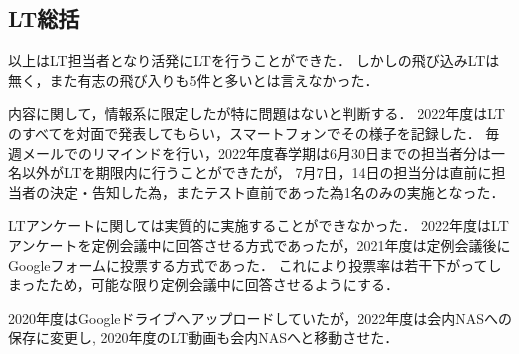 \subsection*{LT総括}


\secondGrade{}以上はLT担当者となり活発にLTを行うことができた．
しかし\firstGrade{}の飛び込みLTは無く，また有志の飛び入りも5件と多いとは言えなかった．

内容に関して，情報系に限定したが特に問題はないと判断する．
2022年度はLTのすべてを対面で発表してもらい，スマートフォンでその様子を記録した．
毎週メールでのリマインドを行い，2022年度春学期は6月30日までの担当者分は一名以外がLTを期限内に行うことができたが，
7月7日，14日の担当分は直前に担当者の決定・告知した為，またテスト直前であった為1名のみの実施となった．

LTアンケートに関しては実質的に実施することができなかった．
2022年度はLTアンケートを定例会議中に回答させる方式であったが，2021年度は定例会議後にGoogleフォームに投票する方式であった．
これにより投票率は若干下がってしまったため，可能な限り定例会議中に回答させるようにする．

2020年度はGoogleドライブへアップロードしていたが，2022年度は会内NASへの保存に変更し,
2020年度のLT動画も会内NASへと移動させた．
